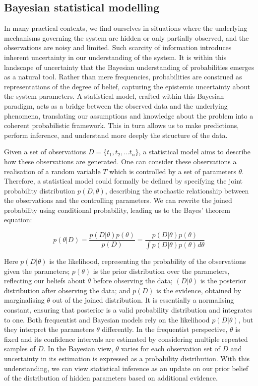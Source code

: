 \subsection{Bayesian statistical modelling}
\label{sec:bayesian-intro}

In many practical contexts, we find ourselves in situations where the underlying mechanisms governing the system are hidden or only partially observed, and the observations are noisy and limited. Such scarcity of information introduces inherent uncertainty in our understanding of the system. It is within this landscape of uncertainty that the Bayesian understanding of probabilities emerges as a natural tool. Rather than mere frequencies, probabilities are construed as representations of the degree of belief, capturing the epistemic uncertainty about the system parameters. A statistical model, crafted within this Bayesian paradigm, acts as a bridge between the observed data and the underlying phenomena, translating our assumptions and knowledge about the problem into a coherent probabilistic framework. This in turn allows us to make predictions, perform inference, and understand more deeply the structure of the data.

Given a set of observations ${D} = \{t_1, t_2, … t_n\}$, a statistical model aims to describe how these observations are generated. One can consider these observations a realisation of a random variable $T$ which is controlled by a set of parameters $\theta$. Therefore, a statistical model could formally be defined by specifying the joint probability distribution $p({D}, \theta)$, describing the stochastic relationship between the observations and the controlling parameters. We can rewrite the joined probability using conditional probability, leading us to the Bayes' theorem equation:

\begin{equation}
p(\theta | {D}) = \frac{p({D} | \theta) p(\theta)}{p({D})} = \frac{p({D} | \theta) p(\theta)}{\int p({D} | \theta) p(\theta) d\theta}
\end{equation}

Here $p({D}|\theta)$ is the likelihood, representing the probability of the observations given the parameters; $p(\theta)$ is the prior distribution over the parameters, reflecting our beliefs about $\theta$ before observing the data; $({D}| \theta)$ is the posterior distribution after observing the data; and $p({D})$ is the evidence, obtained by marginalising $\theta$ out of the joined distribution. It is essentially a normalising constant, ensuring that posterior is a valid probability distribution and integrates to one. 
Both frequentist and Bayesian models rely on the likelihood $p({D}|\theta)$, but they interpret the parameters $\theta$ differently. In the frequentist perspective, $\theta$ is fixed and its confidence intervals are estimated by considering multiple repeated samples of ${D}$. In the Bayesian view, $\theta$ varies for each observation set of ${D}$ and uncertainty in its estimation is expressed as a probability distribution. With this understanding, we can view statistical inference as an update on our prior belief of the distribution of hidden parameters based on additional evidence.

